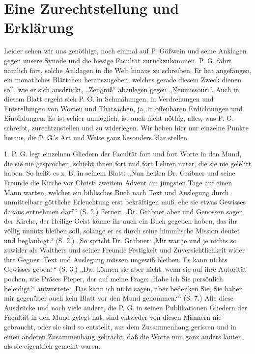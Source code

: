\chapter{Eine Zurechtstellung und Erklärung}

Leider sehen wir uns genöthigt, noch einmal auf P. Gößwein und seine Anklagen gegen unsere Synode und die hiesige Facultät zurückzukommen. P. G. fährt nämlich fort, solche Anklagen in die Welt hinaus zu schreiben. Er hat angefangen, ein monatliches Blättchen herauszugeben, welches gerade diesem Zweck dienen soll, wie er sich ausdrückt, „Zeugniß“ abzulegen gegen „Neumissouri“. Auch in diesem Blatt ergeht sich P. G. in Schmähungen, in Verdrehungen und Entstellungen von Worten und Thatsachen, ja, in offenbaren Erdichtungen und Einbildungen. Es ist schier unmöglich, ist auch nicht nöthig, alles, was P. G. schreibt, zurechtzustellen und zu widerlegen. Wir heben hier nur einzelne Punkte heraus, die P. G.’s Art und Weise ganz besonders klar stellen.

1. P. G. legt einzelnen Gliedern der Facultät fort und fort Worte in den Mund, die sie nie gesprochen, schiebt ihnen fort und fort Lehren unter, die sie nie gelehrt haben. So heißt es z. B. in seinem Blatt: „Nun heißen Dr. Gräbner und seine Freunde die Kirche vor Christi zweitem Advent am jüngsten Tage auf einen Mann warten, welcher ein biblisches Buch nach Text und Auslegung durch unmittelbare göttliche Erleuchtung erst bekräftigen muß, ehe sie etwas Gewisses daraus entnehmen darf.“ (S. 2.) Ferner: „Dr. Gräbner aber und Genossen sagen der Kirche, der Heilige Geist könne ihr auch ein Buch gegeben haben, das ihr völlig unnütz bleiben soll, solange er es durch seine himmlische Mission deutet und beglaubigt.“ (S. 2.) „So spricht Dr. Gräbner: ‚Mir war je und je nichts so zuwider als Walthers und seiner Freunde Festigkeit und Zuversichtlichkeit wider ihre Gegner. Text und Auslegung müssen ungewiß bleiben. Es kann nichts Gewisses geben.‘“ (S. 3.) „Das können sie aber nicht, wenn sie auf ihre Autorität pochen, wie Präses Pieper, der auf meine Frage: ‚Habe ich Sie persönlich beleidigt?‘ antwortete: ‚Das kann ich nicht sagen, aber bedenken Sie, Sie haben mir gegenüber auch kein Blatt vor den Mund genommen.‘“ (S. 7.) Alle diese Ausdrücke und noch viele andere, die P. G. in seinen Publikationen Gliedern der Facultät in den Mund gelegt hat, sind entweder von diesen Männern nie gebraucht, oder sie sind so entstellt, aus dem Zusammenhang gerissen und in einen anderen Zusammenhang gebracht, daß die Worte nun ganz anders lauten, als sie eigentlich gemeint waren.


